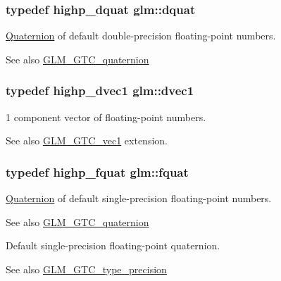 \subsubsection[{dquat}]{\setlength{\rightskip}{0pt plus 5cm}typedef {\bf highp\+\_\+dquat} {\bf glm\+::dquat}}\label{namespaceglm_a49693161673a003b4a8fd4d8b15b0b7b}
\hyperlink{class_quaternion}{Quaternion} of default double-\/precision floating-\/point numbers.

\begin{DoxySeeAlso}{See also}
\hyperlink{group__gtc__quaternion}{G\+L\+M\+\_\+\+G\+T\+C\+\_\+quaternion} 
\end{DoxySeeAlso}
\hypertarget{namespaceglm_a8d5252eec287cf34cc18a219a118f9f2}{}
\subsubsection[{dvec1}]{\setlength{\rightskip}{0pt plus 5cm}typedef {\bf highp\+\_\+dvec1} {\bf glm\+::dvec1}}\label{namespaceglm_a8d5252eec287cf34cc18a219a118f9f2}
1 component vector of floating-\/point numbers. \begin{DoxySeeAlso}{See also}
\hyperlink{group__gtc__vec1}{G\+L\+M\+\_\+\+G\+T\+C\+\_\+vec1} extension. 
\end{DoxySeeAlso}
\hypertarget{namespaceglm_aa95d73f08018f3864c6ae08dbf1c59f2}{}
\subsubsection[{fquat}]{\setlength{\rightskip}{0pt plus 5cm}typedef {\bf highp\+\_\+fquat} {\bf glm\+::fquat}}\label{namespaceglm_aa95d73f08018f3864c6ae08dbf1c59f2}
\hyperlink{class_quaternion}{Quaternion} of default single-\/precision floating-\/point numbers.

\begin{DoxySeeAlso}{See also}
\hyperlink{group__gtc__quaternion}{G\+L\+M\+\_\+\+G\+T\+C\+\_\+quaternion}
\end{DoxySeeAlso}
Default single-\/precision floating-\/point quaternion. \begin{DoxySeeAlso}{See also}
\hyperlink{group__gtc__type__precision}{G\+L\+M\+\_\+\+G\+T\+C\+\_\+type\+\_\+precision} 
\end{DoxySeeAlso}
\hypertarget{namespaceglm_ad24a2ac97dbfbece48f504224bb20b59}{}

